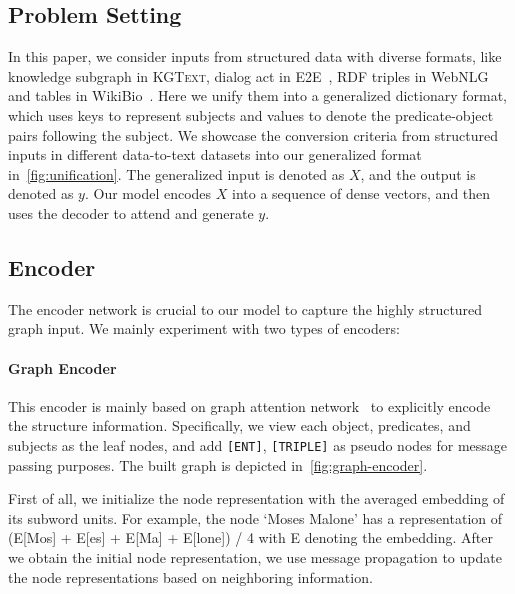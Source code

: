 \documentclass[11pt,a4paper]{article}
\newcommand{\dataset}{\textsc{KGText}\xspace}
\begin{document}
\subsection{Problem Setting}
In this paper, we consider inputs from structured data with diverse formats, like knowledge subgraph in \dataset, dialog act in E2E~\cite{dusek2019e2e}, RDF triples in WebNLG~\cite{shimorina2018handling} and tables in WikiBio~\cite{lebret2016neural}. Here we unify them into a generalized dictionary format, which uses keys to represent subjects and values to denote the predicate-object pairs following the subject. We showcase the conversion criteria from structured inputs in different data-to-text datasets into our generalized format in~\autoref{fig:unification}. The generalized input is denoted as $X$, and the output is denoted as $y$. Our model encodes $X$ into a sequence of dense vectors, and then uses the decoder to attend and generate $y$. 

\subsection{Encoder}
The encoder network is crucial to our model to capture the highly structured graph input. We mainly experiment with two types of encoders:
\paragraph{Graph Encoder}
This encoder is mainly based on graph attention network~\cite{li2015gated,kipf2016semi,velivckovic2017graph} to explicitly encode the structure information. Specifically, we view each object, predicates, and subjects as the leaf nodes, and add \texttt{[ENT]}, \texttt{[TRIPLE]} as pseudo nodes for message passing purposes. The built graph is depicted in~\autoref{fig:graph-encoder}.

First of all, we initialize the node representation with the averaged embedding of its subword units. For example, the node `Moses Malone' has a representation of (E[Mos] + E[es] + E[Ma] + E[lone]) / 4 with E denoting the embedding. After we obtain the initial node representation, we use message propagation to update the node representations based on neighboring information. 
\end{document}

